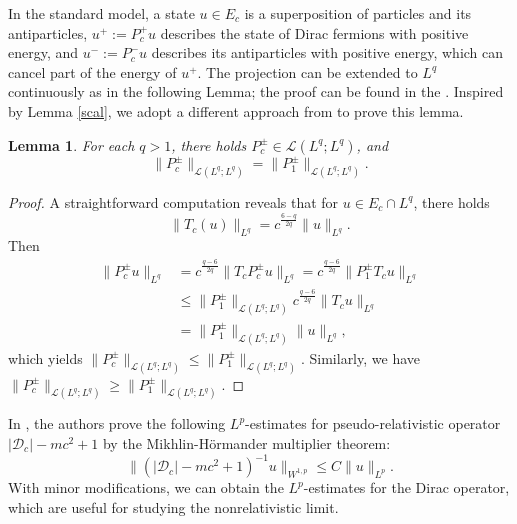\documentclass{amsart}
\theoremstyle{plain}
\newtheorem{lemma}[theorem]{Lemma}
\theoremstyle{definition}
\theoremstyle{remark}
\numberwithin{equation}{section} \numberwithin{figure}{section}
\begin{document}
In the standard model, a state $u\in E_c$ is a superposition of particles and its antiparticles, $u^+:=P_c^+u $ describes the state of Dirac fermions with positive energy, and $u^-:=P_c^-u$ describes its antiparticles with positive energy, which can cancel part of the energy of $u^+$. 
The projection can be extended to $L^q$ continuously as in the following Lemma; the proof can be found in the \cite{dongdingguo}. Inspired by Lemma \ref{scal}, we adopt a different approach from \cite{dongdingguo} to prove this lemma.

\begin{lemma}\label{com}
For each $q>1$, there holds $P_c^\pm\in \mathcal{L}(L^q; L^q)$, and 
$$
   \| P_c^\pm\|_{ \mathcal{L}(L^q; L^q)} = \| P_1^\pm\|_{ \mathcal{L}(L^q; L^q)}.
   $$
\end{lemma}
\begin{proof}
    A straightforward computation reveals that for $u\in E_c\cap L^q$, there holds
    $$
    \|T_c(u)\|_{L^q} = c^{\frac{6-q}{2q}} \|u\|_{L^q}.
    $$
    Then
    \begin{equation}
        \begin{split}
            \|P_c^\pm u\|_{L^q}&=c^{\frac{q-6}{2q}}\|T_cP_c^\pm u\|_{L^q}=
            c^{\frac{q-6}{2q}}\|P_1^\pm T_cu\|_{L^q}\\
            &\leq \| P_1^\pm\|_{ \mathcal{L}(L^q; L^q)}  c^{\frac{q-6}{2q}}
            \| T_cu\|_{L^q}\\
            &= \| P_1^\pm\|_{ \mathcal{L}(L^q; L^q)}\|u\|_{L^q},
        \end{split}
    \end{equation}
    which yields $\| P_c^\pm\|_{ \mathcal{L}(L^q; L^q)} \leq \| P_1^\pm\|_{ \mathcal{L}(L^q; L^q)}$.
    Similarly, we have $\| P_c^\pm\|_{ \mathcal{L}(L^q; L^q)} \geq \| P_1^\pm\|_{ \mathcal{L}(L^q; L^q)}$.
\end{proof}
In \cite[Throrem 1.3]{MR4091059}, the authors prove the following  $L^p$-estimates for  pseudo-relativistic operator $|\mathscr{D}_c|- mc^2 + 1$ by the Mikhlin-Hörmander multiplier theorem:  
 \begin{equation}\label{new_lp0}
  \| (|\mathscr{D}_c|- mc^2 + 1)^{-1} u\|_{W^{1,p}}\leq  C   \|u\|_{L^p}.
 \end{equation}
With minor modifications, we can obtain the $L^p$-estimates for the Dirac operator, 
which are useful for studying the nonrelativistic limit.
\end{document}
